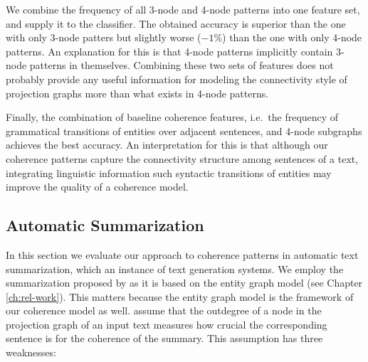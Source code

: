 We combine the frequency of all 3-node and 4-node patterns into one feature set, and supply it to the classifier.   
The obtained accuracy is superior than the one with only 3-node patters but slightly worse  ($-1\%$) than the one with only 4-node patterns. 
An explanation for this is that 4-node patterns implicitly contain 3-node patterns in themselves. 
Combining these two sets of features does not probably provide any useful information for modeling the connectivity style of projection graphs more than what exists in 4-node patterns. 

Finally, the combination of baseline coherence features, i.e.\ the frequency of grammatical transitions of entities over adjacent sentences, and 4-node subgraphs achieves the best accuracy. 
An interpretation for this is that although our coherence patterns capture the connectivity structure among sentences of a text, integrating linguistic information such syntactic transitions of entities may improve the quality of a coherence model.  

\subsection{Automatic Summarization}

In this section we evaluate our approach to coherence patterns in automatic text summarization, which an instance of text generation systems. 
We employ the summarization proposed by  as it is based on the entity graph model (see Chapter \ref{ch:rel-work}). 
This matters because the entity graph model is the framework of our coherence model as well.  
 assume that the outdegree of a node in the projection graph of an input text measures how crucial the corresponding sentence is for the coherence of the summary.  
This assumption has three weaknesses: 

